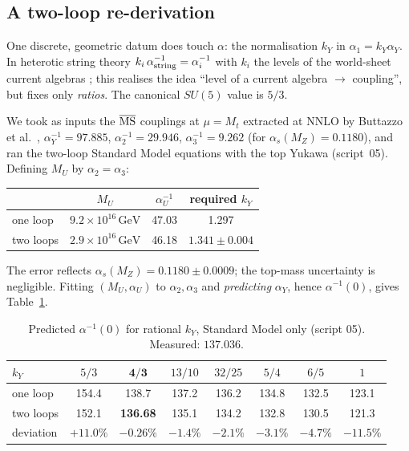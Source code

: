 \documentclass[11pt,a4paper]{article}
\newcommand{\ainv}{\alpha^{-1}}
\newcommand{\kY}{k_Y}
\newcommand{\GeV}{\,\mathrm{GeV}}
\newcommand{\MU}{M_U}
\begin{document}
\subsection{A two-loop re-derivation}
One discrete, geometric datum does touch $\alpha$: the normalisation $\kY$ in $\alpha_1=\kY\alpha_Y$. In heterotic string
theory $k_i\,\ainv_{\rm string}=\ainv_i$ with $k_i$ the levels of the world-sheet current algebras \cite{DienesReview}; this
realises the idea ``level of a current algebra $\to$ coupling'', but fixes only \emph{ratios}. The canonical $SU(5)$ value is $5/3$.

We took as inputs the $\overline{\rm MS}$ couplings at $\mu=M_t$ extracted at NNLO by Buttazzo et al.\ \cite{Buttazzo},
$\ainv_Y=97.885$, $\ainv_2=29.946$, $\ainv_3=9.262$ (for $\alpha_s(M_Z)=0.1180$), and ran the two-loop Standard Model
equations \cite{MV} with the top Yukawa (script~05). Defining $\MU$ by $\alpha_2=\alpha_3$:
\begin{center}\begin{tabular}{lccc}\toprule
 & $\MU$ & $\ainv_U$ & required $\kY$\\\midrule
one loop & $9.2\times10^{16}\GeV$ & 47.03 & 1.297\\
two loops & $2.9\times10^{16}\GeV$ & 46.18 & $\mathbf{1.341\pm0.004}$\\\bottomrule
\end{tabular}\end{center}
The error reflects $\alpha_s(M_Z)=0.1180\pm0.0009$; the top-mass uncertainty is negligible. Fitting $(\MU,\alpha_U)$ to
$\alpha_2,\alpha_3$ and \emph{predicting} $\alpha_Y$, hence $\ainv(0)$, gives Table~\ref{tab:kY}.

\begin{table}[h]\centering
\caption{Predicted $\ainv(0)$ for rational $\kY$, Standard Model only (script 05). Measured: $137.036$.}\label{tab:kY}
\begin{tabular}{lccccccc}\toprule
$\kY$ & $5/3$ & $\mathbf{4/3}$ & $13/10$ & $32/25$ & $5/4$ & $6/5$ & $1$\\\midrule
one loop & 154.4 & 138.7 & 137.2 & 136.2 & 134.8 & 132.5 & 123.1\\
two loops & 152.1 & \textbf{136.68} & 135.1 & 134.2 & 132.8 & 130.5 & 121.3\\
deviation & $+11.0\%$ & $\mathbf{-0.26\%}$ & $-1.4\%$ & $-2.1\%$ & $-3.1\%$ & $-4.7\%$ & $-11.5\%$\\\bottomrule
\end{tabular}\end{table}
\end{document}
